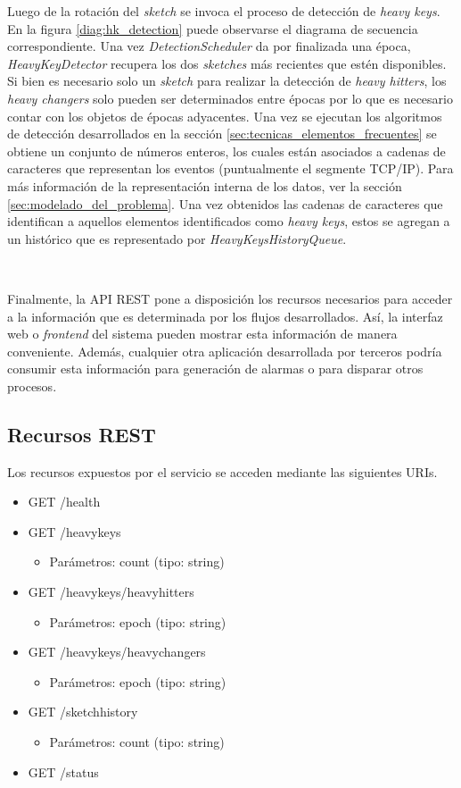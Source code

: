 \documentclass[a4paper,12pt, oneside]{article}
\begin{document}
Luego de la rotación del \textit{sketch} se invoca el proceso de detección de \textit{heavy keys}. En la figura \ref{diag:hk_detection} puede observarse el diagrama de secuencia correspondiente. Una vez \textit{DetectionScheduler} da por finalizada una época, \textit{HeavyKeyDetector} recupera los dos \textit{sketches} más recientes que estén disponibles. Si bien es necesario solo un \textit{sketch} para realizar la detección de \textit{heavy hitters}, los \textit{heavy changers} solo pueden ser determinados entre épocas por lo que es necesario contar con los objetos de épocas adyacentes. Una vez se ejecutan los algoritmos de detección desarrollados en la sección \ref{sec:tecnicas_elementos_frecuentes} se obtiene un conjunto de números enteros, los cuales están asociados a cadenas de caracteres que representan los eventos (puntualmente el segmente TCP/IP). Para más información de la representación interna de los datos, ver la sección \ref{sec:modelado_del_problema}. Una vez obtenidos las cadenas de caracteres que identifican a aquellos elementos identificados como \textit{heavy keys}, estos se agregan a un histórico que es representado por \textit{HeavyKeysHistoryQueue}.

\

Finalmente, la API REST pone a disposición los recursos necesarios para acceder a la información que es determinada por los flujos desarrollados. Así, la interfaz web o \textit{frontend} del sistema pueden mostrar esta información de manera conveniente. Además, cualquier otra aplicación desarrollada por terceros podría consumir esta información para generación de alarmas o para disparar otros procesos.

\subsection{Recursos REST}
Los recursos expuestos por el servicio se acceden mediante las siguientes URIs.

\begin{itemize}
	\item GET     /health
	\item GET     /heavykeys
	\begin{itemize}
		\item Parámetros: count (tipo: string)
	\end{itemize}
	\item GET     /heavykeys/heavyhitters
	\begin{itemize}
		\item Parámetros: epoch (tipo: string)
	\end{itemize}
	\item GET     /heavykeys/heavychangers
	\begin{itemize}
		\item Parámetros: epoch (tipo: string)
	\end{itemize}
	\item GET     /sketchhistory
	\begin{itemize}
		\item Parámetros: count (tipo: string)
	\end{itemize}
	\item GET     /status
\end{itemize}
\end{document}
